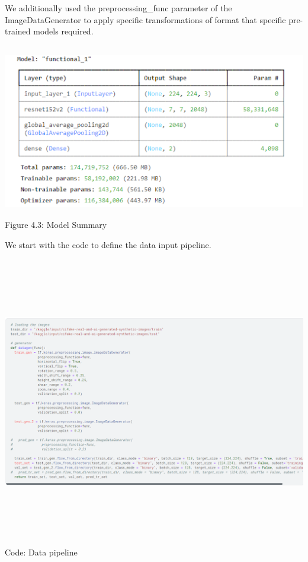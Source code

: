 We additionally used the preprocessing\_func parameter of the ImageDataGenerator to apply specific transformations of format that specific pre-trained models required.

\begin{center}
   \includegraphics[width=6in,height=3in]{images/4.3.png} 
   \\\fontsize{11pt}{24pt} Figure 4.3: Model Summary
\end{center}

			


We start with the code to define the data input pipeline.
\begin{center}
   \includegraphics[width=6in,height=5in]{images/c1.png} 
   \\\fontsize{11pt}{24pt} Code: Data pipeline
\end{center}
  
